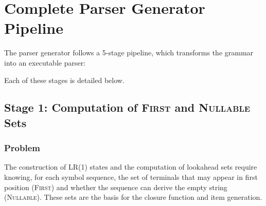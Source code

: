 \documentclass[12pt,a4paper]{report}
\begin{document}
\section{Complete Parser Generator Pipeline}

The parser generator follows a 5-stage pipeline, which transforms the grammar
into an executable parser:

\begin{center}
\end{center}

Each of these stages is detailed below.

\subsection{Stage 1: Computation of \textsc{First} and \textsc{Nullable} Sets}

\subsubsection{Problem}
The construction of LR(1) states and the computation of lookahead sets require knowing,
for each symbol sequence, the set of terminals that may appear
in first position (\textsc{First}) and whether the sequence can derive the empty string (\textsc{Nullable}).
These sets are the basis for the closure function and item generation.
\end{document}

